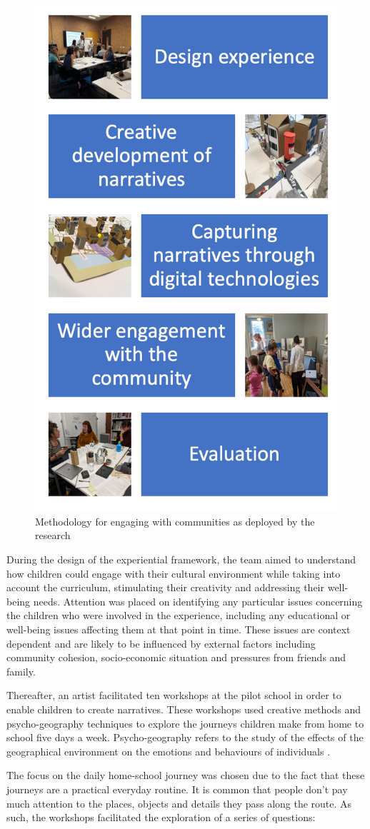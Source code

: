 \documentclass[acmlarge,screen,dvipsnames]{acmart}
\begin{document}
\begin{figure}[h]
  \centering
  \includegraphics[width=0.3\linewidth]{images/method}
\caption{Methodology for engaging with communities as deployed by the research}
\label{fig:method}
\end{figure}


During the design of the experiential framework, the team aimed to understand how children
could engage with their cultural environment while taking into account the 
curriculum, stimulating their creativity and addressing their well-being
needs. Attention was placed on identifying any particular issues
concerning the children who were involved in the experience, including any
educational or well-being issues affecting them at that point
in time. These issues are context dependent and are likely to be influenced by
external factors including community cohesion, socio-economic situation and
pressures from friends and family.

Thereafter, an artist facilitated ten workshops at the pilot school in order to
enable children to create narratives. These workshops used creative methods
and psycho-geography techniques to explore the journeys children make from home
to school five days a week. Psycho-geography refers to the study of the effects
of the geographical environment on the emotions and behaviours of individuals
\cite{coverley2006psychogeography}. 

The focus on the daily home-school journey was chosen due to the fact that
these journeys are a practical everyday routine. It is common that people
don't pay much attention to the places, objects and details they pass along
the route. As such, the workshops facilitated the exploration of a series of
questions:
\end{document}
